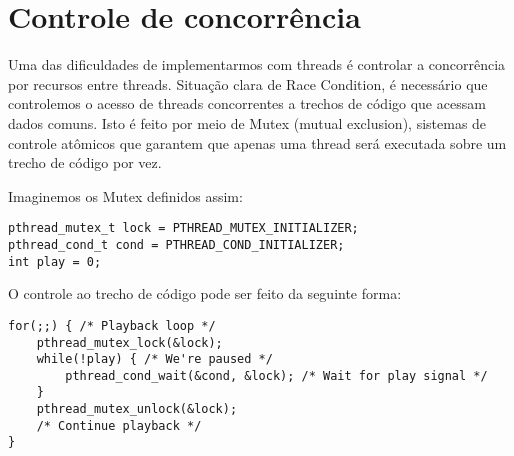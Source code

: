 \section{Controle de concorrência}

Uma das dificuldades de implementarmos com threads é controlar a concorrência por recursos entre threads.
Situação clara de Race Condition, é necessário que controlemos o acesso de threads concorrentes a trechos 
de código que acessam dados comuns. Isto é feito por meio de Mutex (mutual exclusion), sistemas de controle
atômicos que garantem que apenas uma thread será executada sobre um trecho de código por vez.

Imaginemos os Mutex definidos assim:

\begin{lstlisting}
pthread_mutex_t lock = PTHREAD_MUTEX_INITIALIZER;
pthread_cond_t cond = PTHREAD_COND_INITIALIZER;
int play = 0;
\end{lstlisting}

O controle ao trecho de código pode ser feito da seguinte forma:

\begin{lstlisting}
for(;;) { /* Playback loop */
    pthread_mutex_lock(&lock);
    while(!play) { /* We're paused */
        pthread_cond_wait(&cond, &lock); /* Wait for play signal */
    }
    pthread_mutex_unlock(&lock);
    /* Continue playback */
}
\end{lstlisting}

